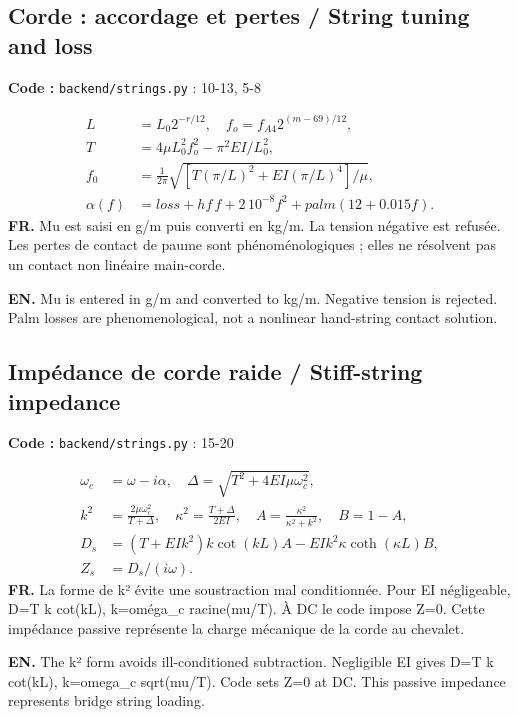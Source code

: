 \documentclass[10pt,a4paper]{article}
\newcommand{\FR}[1]{\textbf{FR.} #1\par}\newcommand{\EN}[1]{{\selectlanguage{english}\textbf{EN.} #1\par}}
\newcommand{\loc}[1]{{\small\color{ink}\textbf{Code :} #1\par}}
\begin{document}
\begin{samepage}\subsection{Corde : accordage et pertes / String tuning and loss}
\loc{\texttt{backend/strings.py} : 10-13, 5-8}
\begin{align}L&=L_0 2^{-r/12},\quad f_o=f_{A4}2^{(m-69)/12},\\
T&=4\mu L_0^2f_o^2-\pi^2EI/L_0^2,\\
f_0&=\frac1{2\pi}\sqrt{[T(\pi/L)^2+EI(\pi/L)^4]/\mu},\\
\alpha(f)&=loss+hf\,f+2\,10^{-8}f^2+palm(12+0.015f).\end{align}
\FR{Mu est saisi en g/m puis converti en kg/m. La tension négative est refusée. Les pertes de contact de paume sont phénoménologiques ; elles ne résolvent pas un contact non linéaire main-corde.}
\EN{Mu is entered in g/m and converted to kg/m. Negative tension is rejected. Palm losses are phenomenological, not a nonlinear hand-string contact solution.}
\end{samepage}
\begin{samepage}\subsection{Impédance de corde raide / Stiff-string impedance}
\loc{\texttt{backend/strings.py} : 15-20}
\begin{align}\omega_c&=\omega-i\alpha,\quad\Delta=\sqrt{T^2+4EI\mu\omega_c^2},\\
k^2&=\frac{2\mu\omega_c^2}{T+\Delta},\quad\kappa^2=\frac{T+\Delta}{2EI},\quad A=\frac{\kappa^2}{\kappa^2+k^2},\quad B=1-A,\\
D_s&=(T+EI k^2)k\cot(kL)A-EI k^2\kappa\coth(\kappa L)B,\\
Z_s&=D_s/(i\omega).\end{align}
\FR{La forme de k² évite une soustraction mal conditionnée. Pour EI négligeable, D=T k cot(kL), k=oméga\_c racine(mu/T). À DC le code impose Z=0. Cette impédance passive représente la charge mécanique de la corde au chevalet.}
\EN{The k² form avoids ill-conditioned subtraction. Negligible EI gives D=T k cot(kL), k=omega\_c sqrt(mu/T). Code sets Z=0 at DC. This passive impedance represents bridge string loading.}
\end{samepage}
\end{document}
